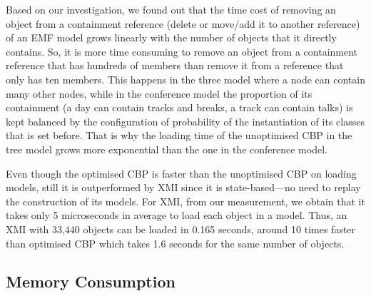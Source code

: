\documentclass{llncs}
\begin{document}
Based on our investigation, we found out that the time cost of removing an object from a containment reference (delete or move/add it to another reference) of an EMF model grows linearly with the number of objects that it directly contains. So, it is more time consuming to remove an object from a containment reference that has hundreds of members than remove it from a reference that only has ten members. This  happens in the three model where a node can contain many other nodes, while in the conference model the proportion of its containment (a day can contain tracks and breaks, a track can contain talks) is kept balanced by the configuration of probability of the instantiation of its classes that is set before. That is why the loading time of the unoptimised CBP in the tree model grows more exponential than the one in the conference model.   
         
Even though the optimised CBP is faster than the unoptimised CBP on loading models, still it is outperformed by XMI since it is state-based---no need to replay the construction of its models. For XMI, from our measurement, we obtain that it takes only 5 microseconds in average to load each object in a model. Thus, an XMI with 33,440 objects can be loaded in 0.165 seconds, around 10 times faster than optimised CBP which takes 1.6 seconds for the same number of objects. 

\subsection{Memory Consumption}
\label{subsec:memory_consumption}
\end{document}
